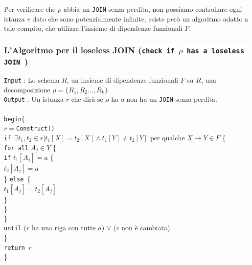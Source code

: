 \documentclass[12pt, letterpaper]{article}
\newcommand{\code}[1]{\colorbox{light-gray}{\texttt{#1}}}
\newcommand{\codee}[1]{\colorbox{white}{\texttt{#1}}}
\newcommand{\acc}{\\\hphantom{}\\}
\begin{document}
Per verificare che \(\rho\) abbia un \codee{JOIN} senza perdita, non possiamo controllare ogni istanza \(r\) dato che sono 
potenzialmente infinite, esiste però un algoritmo adatto a tale compito, che utilizza 
l'insieme di dipendenze funzionali \(F\).
\subsubsection{L'Algoritmo per il loseless JOIN (\codee{check if }\(\rho\)\codee{ has a loseless JOIN })}
\code{Input} : Lo schema \(R\), un insieme di dipendenze funzionali \(F\) su \(R\), una decomposizione \(\rho=\{R_1,R_2\dots,R_k\}\).\\
\code{Output} : Un istanza \(r\) che dirà se \(\rho\) ha o non ha un \codee{JOIN} senza perdita.\acc
\hphantom{ident}\codee{begin}\{\\
\hphantom{ident}\hphantom{ident} \(r=\)\codee{Construct()}\\ 
\hphantom{ident}\hphantom{ident}\hphantom{ident} \codee{if }\(\exists t_1,t_2\in r|t_1[X]=t_2[X]\land t_1[Y]\ne t_2[Y]\text{ per qualche }X\rightarrow Y \in F\) \{\\ 
\hphantom{ident}\hphantom{ident}\hphantom{ident}\hphantom{ident} \codee{for all} \( A_j\in Y \) \{ \\  
\hphantom{ident}\hphantom{ident}\hphantom{ident}\hphantom{ident}\hphantom{ident} \codee{if} \(t_1[A_j]=a\) \{ \\
\hphantom{ident}\hphantom{ident}\hphantom{ident}\hphantom{ident}\hphantom{ident}\(t_2[A_j]=a\) \\
\hphantom{ident}\hphantom{ident}\hphantom{ident}\hphantom{ident}\hphantom{ident} \} \codee{else }\{\\
\hphantom{ident}\hphantom{ident}\hphantom{ident}\hphantom{ident}\hphantom{ident} \(t_1[A_j]=t_2[A_j]\)\\
\hphantom{ident}\hphantom{ident}\hphantom{ident}\hphantom{ident}\hphantom{ident} \} \\
\hphantom{ident}\hphantom{ident}\hphantom{ident}\hphantom{ident} \} \\
\hphantom{ident}\hphantom{ident}\hphantom{ident}\} \\
\hphantom{ident}\hphantom{ident}\hphantom{ident} \codee{until} (\(r\) ha una riga con tutte \(a\)) \(\lor\) (\(r\) non è cambiata)\\
\hphantom{ident}\hphantom{ident} \}\\ 
\hphantom{ident}\hphantom{ident} \codee{return }\(r\)\\ 
\hphantom{ident}\}\acc
\end{document}
